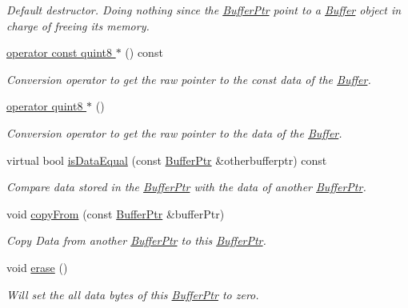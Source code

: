 \begin{DoxyCompactItemize}
\begin{DoxyCompactList}\small\item\em Default destructor. Doing nothing since the \hyperlink{class_gost_crypt_1_1_buffer_ptr}{Buffer\+Ptr} point to a \hyperlink{class_gost_crypt_1_1_buffer}{Buffer} object in charge of freeing its memory. \end{DoxyCompactList}\item 
\hyperlink{class_gost_crypt_1_1_buffer_ptr_afa63d10b1a96abc0d2f9f970b3757036}{operator const quint8 $\ast$} () const
\begin{DoxyCompactList}\small\item\em Conversion operator to get the raw pointer to the const data of the \hyperlink{class_gost_crypt_1_1_buffer}{Buffer}. \end{DoxyCompactList}\item 
\hyperlink{class_gost_crypt_1_1_buffer_ptr_a26f6c7dee1ea552efd12e0141ccde215}{operator quint8 $\ast$} ()
\begin{DoxyCompactList}\small\item\em Conversion operator to get the raw pointer to the data of the \hyperlink{class_gost_crypt_1_1_buffer}{Buffer}. \end{DoxyCompactList}\item 
virtual bool \hyperlink{class_gost_crypt_1_1_buffer_ptr_aca56ffd5d6e0d9d4c1fcc10e7cde96c8}{is\+Data\+Equal} (const \hyperlink{class_gost_crypt_1_1_buffer_ptr}{Buffer\+Ptr} \&otherbufferptr) const
\begin{DoxyCompactList}\small\item\em Compare data stored in the \hyperlink{class_gost_crypt_1_1_buffer_ptr}{Buffer\+Ptr} with the data of another \hyperlink{class_gost_crypt_1_1_buffer_ptr}{Buffer\+Ptr}. \end{DoxyCompactList}\item 
void \hyperlink{class_gost_crypt_1_1_buffer_ptr_af8322ddb56015cc17282704b45863223}{copy\+From} (const \hyperlink{class_gost_crypt_1_1_buffer_ptr}{Buffer\+Ptr} \&buffer\+Ptr)
\begin{DoxyCompactList}\small\item\em Copy Data from another \hyperlink{class_gost_crypt_1_1_buffer_ptr}{Buffer\+Ptr} to this \hyperlink{class_gost_crypt_1_1_buffer_ptr}{Buffer\+Ptr}. \end{DoxyCompactList}\item 
void \hyperlink{class_gost_crypt_1_1_buffer_ptr_abb781db760af4ff975c6f98eaf669dfe}{erase} ()
\begin{DoxyCompactList}\small\item\em Will set the all data bytes of this \hyperlink{class_gost_crypt_1_1_buffer_ptr}{Buffer\+Ptr} to zero. \end{DoxyCompactList}\item 

\end{DoxyCompactItemize}
